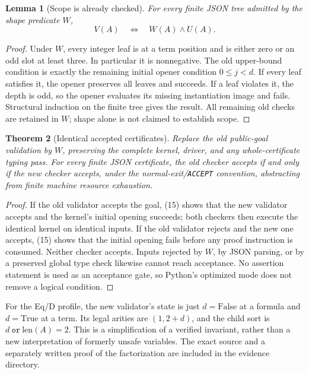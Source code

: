 \documentclass[11pt,letterpaper]{article}
\newtheorem{theorem}{Theorem}[section]
\newtheorem{lemma}[theorem]{Lemma}
\theoremstyle{definition}\newtheorem{definition}[theorem]{Definition}
\theoremstyle{remark}\newtheorem{remark}[theorem]{Remark}
\newcommand{\code}[1]{\texttt{#1}}
\begin{document}
\begin{lemma}[Scope is already checked]
For every finite JSON tree admitted by the shape predicate \(W\),
\[
                      V(A)\quad\Longleftrightarrow\quad W(A)\land U(A).
 \tag{15}
\]
\end{lemma}
\begin{proof}
Under \(W\), every integer leaf is at a term position and is either
zero or an odd slot at least three. In particular it is nonnegative.
The old upper-bound condition is exactly the remaining initial opener
condition \(0\leq j<d\). If every leaf satisfies it, the opener preserves
all leaves and succeeds. If a leaf violates it, the depth is odd, so
the opener evaluates its missing instantiation image and fails. Structural
induction on the finite tree gives the result. All remaining old checks
are retained in \(W\); shape alone is not claimed to establish scope.
\end{proof}

\begin{theorem}[Identical accepted certificates]
Replace the old public-goal validation by \(W\), preserving the complete
kernel, driver, and any whole-certificate typing pass. For every finite
JSON certificate, the old checker accepts if and only if the new checker
accepts, under the normal-exit/\code{ACCEPT} convention, abstracting from finite machine resource exhaustion.
\end{theorem}
\begin{proof}
If the old validator accepts the goal, (15) shows that the new validator
accepts and the kernel's initial opening succeeds; both checkers then
execute the identical kernel on identical inputs. If the old validator
rejects and the new one accepts, (15) shows that the initial opening
fails before any proof instruction is consumed. Neither checker accepts.
Inputs rejected by \(W\), by JSON parsing, or by a preserved global type
check likewise cannot reach acceptance. No assertion statement is used
as an acceptance gate, so Python's optimized mode does not remove a
logical condition.
\end{proof}

For the Eq/D profile, the new validator's state is just
\(d=\mathrm{False}\) at a formula and \(d=\mathrm{True}\) at a term.
Its legal arities are \((1,2+d)\), and the child sort is
\(d\ \texttt{or}\ \mathrm{len}(A)=2\). This is a simplification of a
verified invariant, rather than a new interpretation of formerly unsafe
variables. The exact source and a separately written proof of the
factorization are included in the evidence directory.
\end{document}

